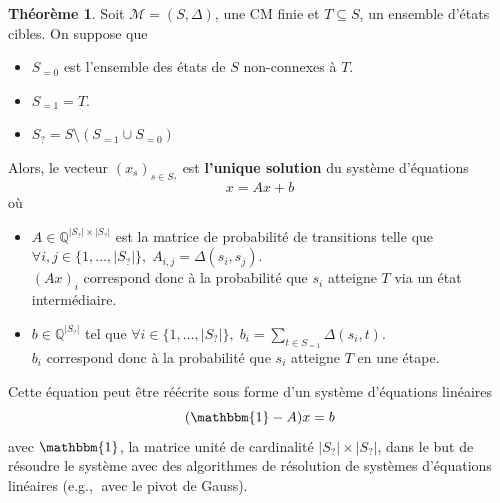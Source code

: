 \documentclass[12pt,a4paper]{report}
\theoremstyle{definition}%
\newtheorem{theorem}{Théorème}[chapter]
\theoremstyle{remark}
\newcommand{\eg}{e.g., }
\let\labelitemi\labelitemii
\begin{document}
\begin{theorem} \label{reachability-theorem}
	Soit $\mathcal{M} = (S, \Delta)$, une CM finie et $T \subseteq S$, un ensemble d'états cibles. On suppose que
	\begin{itemize}
		\renewcommand{\labelitemi}{\tiny$\bullet$}
		\item $S_{=0}$ est l'ensemble des états de $S$ non-connexes à $T$.
		\item $S_{=1} = T$.
		\item $S_? = S \setminus (S_{=1} \cup S_{=0})$
	\end{itemize}
	Alors, le vecteur $(x_s)_{s \in S_?}$ est \textbf{l'unique solution} du système d'équations
	\[ x = Ax + b \]
	où
	\begin{itemize}
	\renewcommand{\labelitemi}{\tiny$\bullet$}
	\item $A \in \mathbb{Q}^{|S_?| \times |S_?|}$ est la matrice de probabilité de transitions telle que $\forall i, j \in \{1, \dots, |S_?| \}, \; A_{i, j} = \Delta(s_i, s_j)$. \\ $(Ax)_{i}$ correspond donc à la probabilité que $s_i$ atteigne $T$ via un état intermédiaire.
	\item $b \in \mathbb{Q}^{|S_?|}$ tel que $\forall i \in \{ 1, \dots, |S_?| \}, \; b_i = \sum_{t \in S_{=1}} \Delta(s_i, t)$. \\ $b_{i}$ correspond donc à la probabilité que $s_i$ atteigne $T$ en une étape.
	\end{itemize}
Cette équation peut être réécrite sous forme d'un système d'équations linéaires
\[ (\mathbbm{1} - A) x = b \]
avec $\mathbbm{1}$, la matrice unité de cardinalité $|S_?| \times |S_?|$, dans le but de résoudre le système avec des algorithmes de résolution de systèmes d'équations linéaires (\eg $\;$avec le pivot de Gauss).\\

\end{theorem}
\end{document}
